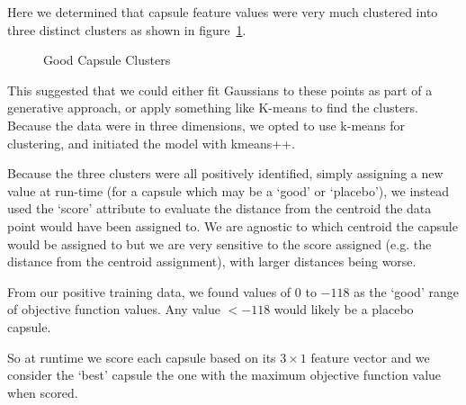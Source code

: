 \documentclass[11pt, oneside]{article}   	%
\begin{document}
Here we determined that capsule feature values were very much clustered into three distinct clusters as shown in figure~\ref{fig:capsules}.
\begin{figure}[h!]
  \centering
  \caption{Good Capsule Clusters}
  \label{fig:capsules}
 \end{figure}


This suggested that we could either fit Gaussians to these points as part of a generative approach, or apply something like K-means to find the clusters. Because the data were in three dimensions, we opted to use k-means for clustering, and initiated the model with kmeans++.

Because the three clusters were all positively identified, simply assigning a new value at run-time (for a capsule which may be a `good' or `placebo'), we instead used the `score' attribute to evaluate the distance from the centroid the data point would have been assigned to. We are agnostic to which centroid the capsule would be assigned to but we are very sensitive to the score assigned (e.g. the distance from the centroid assignment), with larger distances being worse.

From our positive training data, we found values of $0$ to $-118$ as the `good' range of objective function values. Any value $<-118$ would likely be a placebo capsule.

So at runtime we score each capsule based on its $3\times1$ feature vector and we consider the `best' capsule the one with the maximum objective function value when scored.
\end{document}
